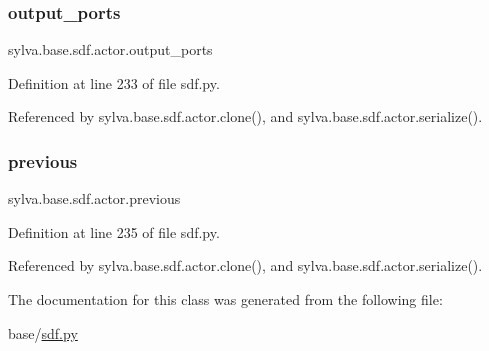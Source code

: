 \subsubsection{\texorpdfstring{output\+\_\+ports}{output\_ports}}
{\footnotesize\ttfamily sylva.\+base.\+sdf.\+actor.\+output\+\_\+ports}



Definition at line 233 of file sdf.\+py.



Referenced by sylva.\+base.\+sdf.\+actor.\+clone(), and sylva.\+base.\+sdf.\+actor.\+serialize().

\mbox{\label{classsylva_1_1base_1_1sdf_1_1actor_ac3043c8e8aa528bb6d00465b0a1964d3}} 
\subsubsection{\texorpdfstring{previous}{previous}}
{\footnotesize\ttfamily sylva.\+base.\+sdf.\+actor.\+previous}



Definition at line 235 of file sdf.\+py.



Referenced by sylva.\+base.\+sdf.\+actor.\+clone(), and sylva.\+base.\+sdf.\+actor.\+serialize().



The documentation for this class was generated from the following file\+:\begin{DoxyCompactItemize}
\item 
base/\hyperlink{sdf_8py}{sdf.\+py}\end{DoxyCompactItemize}
